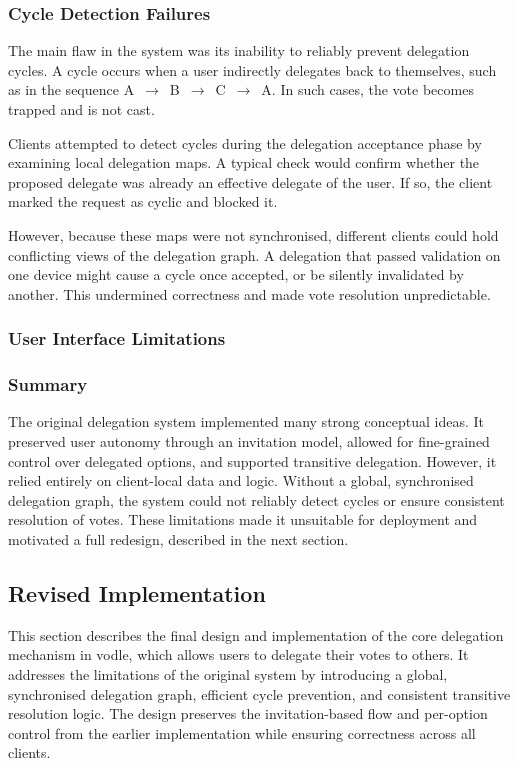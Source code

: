 \subsubsection*{Cycle Detection Failures}

The main flaw in the system was its inability to reliably prevent delegation cycles. A cycle occurs when a user indirectly delegates back to themselves, such as in the sequence A~$\rightarrow$~B~$\rightarrow$~C~$\rightarrow$~A. In such cases, the vote becomes trapped and is not cast.

Clients attempted to detect cycles during the delegation acceptance phase by examining local delegation maps. A typical check would confirm whether the proposed delegate was already an effective delegate of the user. If so, the client marked the request as cyclic and blocked it.

However, because these maps were not synchronised, different clients could hold conflicting views of the delegation graph. A delegation that passed validation on one device might cause a cycle once accepted, or be silently invalidated by another. This undermined correctness and made vote resolution unpredictable.

\subsubsection*{User Interface Limitations}

\subsubsection*{Summary}

The original delegation system implemented many strong conceptual ideas. It preserved user autonomy through an invitation model, allowed for fine-grained control over delegated options, and supported transitive delegation. However, it relied entirely on client-local data and logic. Without a global, synchronised delegation graph, the system could not reliably detect cycles or ensure consistent resolution of votes. These limitations made it unsuitable for deployment and motivated a full redesign, described in the next section.

\subsection{Revised Implementation}
This section describes the final design and implementation of the core delegation mechanism in vodle, which allows users to delegate their votes to others. It addresses the limitations of the original system by introducing a global, synchronised delegation graph, efficient cycle prevention, and consistent transitive resolution logic. The design preserves the invitation-based flow and per-option control from the earlier implementation while ensuring correctness across all clients.

